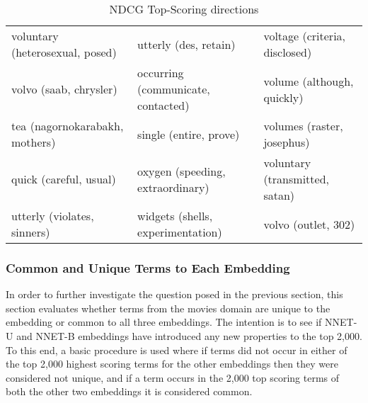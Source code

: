\begin{table}[]
\begin{tabular}{lll}
		voluntary (heterosexual, posed)          & utterly (des, retain)                             & voltage (criteria, disclosed)                            \\
		volvo (saab, chrysler)                   & occurring (communicate, contacted)                & volume (although, quickly)                               \\
		tea (nagornokarabakh, mothers)           & single (entire, prove)                            & volumes (raster, josephus)                               \\
		quick (careful, usual)                   & oxygen (speeding, extraordinary)                  & voluntary (transmitted, satan)                           \\
		utterly (violates, sinners)              & widgets (shells, experimentation)                 & volvo (outlet, 302)                                     
	\end{tabular}\caption{NDCG Top-Scoring directions}\label{ch5:topscores}
\end{table}

\subsubsection{Common and Unique Terms to Each Embedding}\label{ch5:commonunique}

In order to further investigate the question posed in the previous section, this section evaluates whether terms from the movies domain are unique to the embedding or common to all three embeddings. The intention is to see if NNET-U and NNET-B embeddings have introduced any new properties to the top 2,000. To this end,  a basic procedure is used  where if terms did not occur in either of the top 2,000 highest scoring terms for the other embeddings then they were considered not unique, and if a term  occurs in the 2,000 top scoring terms of both the other two embeddings it is considered common. 


